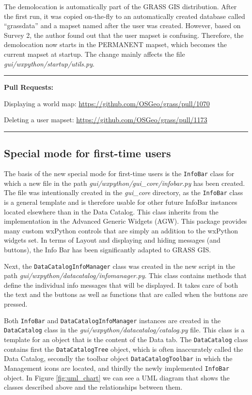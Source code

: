 \documentclass[a4paper,10pt,twoside]{article}
\begin{document}
The demolocation is automatically part of the GRASS GIS distribution. After the first run, it was copied on-the-fly to an automatically created database called ``grassdata'' and a mapset named after the user was created. However, based on Survey 2, the author found out that the user mapset is confusing. Therefore, the demolocation now starts in the PERMANENT mapset, which becomes the current mapset at startup. The change mainly affects the file \textit{gui/wxpython/startup/utils.py}.

\par\noindent\rule{\textwidth}{0.4pt}
\textbf{Pull Requests:}

Displaying a world map: \url{https://github.com/OSGeo/grass/pull/1070}

Deleting a user mapset: \url{https://github.com/OSGeo/grass/pull/1173}

\par\noindent\rule{\textwidth}{0.4pt}

\subsection{Special mode for first-time users}

\noindent \large The basis of the new special mode for first-time users is the \texttt{InfoBar} class for which a new file in the path \textit{gui/wxpython/gui\_core/infobar.py} has been created. The file was intentionally created in the \textit{gui\_core} directory, as the \texttt{InfoBar} class is a general template and is therefore usable for other future InfoBar instances located elsewhere than in the Data Catalog. This class inherits from the implementation in the Advanced Generic Widgets (AGW). This package provides many custom wxPython controls that are simply an addition to the wxPython widgets set. In terms of Layout and displaying and hiding messages (and buttons), the Info Bar has been significantly adapted to GRASS GIS.

Next, the \texttt{DataCatalogInfoManager} class was created in the new script in the path \textit{gui/wxpython/datacatalog/infomanager.py}. This class contains methods that define the individual info messages that will be displayed. It takes care of both the text and the buttons as well as functions that are called when the buttons are pressed.

Both \texttt{InfoBar} and \texttt{DataCatalogInfoManager} instances are created in the \texttt{DataCatalog} class in the \textit{gui/wxpython/datacatalog/catalog.py} file. This class is a template for an object that is the content of the Data tab. The \texttt{DataCatalog} class contains first the \texttt{DataCatalogTree} object, which is often inaccurately called the Data Catalog, secondly the toolbar object \texttt{DataCatalogToolbar} in which the Management icons are located, and thirdly the newly implemented \texttt{InfoBar} object. In Figure \ref{fig:uml_chart} we can see a UML diagram that shows the classes described above and the relationships between them.
\end{document}
